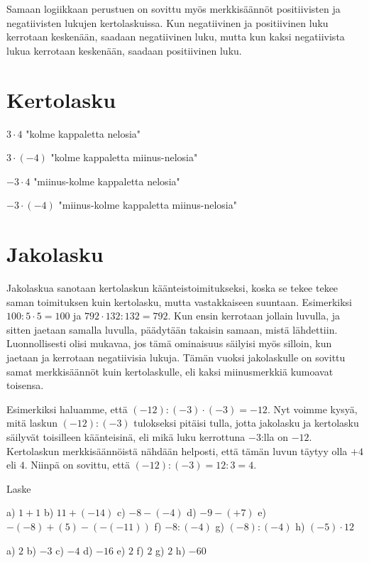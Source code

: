 
Samaan logiikkaan perustuen on sovittu myös merkkisäännöt positiivisten ja negatiivisten lukujen kertolaskuissa. Kun negatiivinen ja positiivinen luku kerrotaan keskenään, saadaan negatiivinen luku, mutta kun kaksi negatiivista lukua kerrotaan keskenään, saadaan positiivinen luku.

\section{Kertolasku}

$3 \cdot 4$ "kolme kappaletta nelosia"


$3 \cdot (-4)$ "kolme kappaletta miinus-nelosia"


$-3 \cdot 4$ "miinus-kolme kappaletta nelosia"


$-3 \cdot (-4)$ "miinus-kolme kappaletta miinus-nelosia"


\section{Jakolasku}

Jakolaskua sanotaan kertolaskun käänteistoimitukseksi, koska se tekee tekee saman toimituksen kuin kertolasku, mutta vastakkaiseen suuntaan. Esimerkiksi $100:5\cdot 5=100$ ja $792\cdot 132:132=792$. Kun ensin kerrotaan jollain luvulla, ja sitten jaetaan samalla luvulla, päädytään takaisin samaan, mistä lähdettiin. Luonnollisesti olisi mukavaa, jos tämä ominaisuus säilyisi myös silloin, kun jaetaan ja kerrotaan negatiivisia lukuja. Tämän vuoksi jakolaskulle on sovittu samat merkkisäännöt kuin kertolaskulle, eli kaksi miinusmerkkiä kumoavat toisensa.

Esimerkiksi haluamme, että $(-12):(-3)\cdot (-3)=-12$. Nyt voimme kysyä, mitä laskun $(-12):(-3)$ tulokseksi pitäisi tulla, jotta jakolasku ja kertolasku säilyvät toisilleen käänteisinä, eli mikä luku kerrottuna $-3$:lla on $-12$. Kertolaskun merkkisäännöistä nähdään helposti, että tämän luvun täytyy olla $+4$ eli $4$. Niinpä on sovittu, että $(-12):(-3)=12:3=4$.

Laske

\begin{tehtava}
    a) $1+1$
    b) $11+(-14)$
    c) $-8-(-4)$
    d) $-9-(+7)$
    e) $-(-8)+(5)-(-(-11))$
    f) $-8:(-4)$
    g) $(-8):(-4)$
    h) $(-5)\cdot 12$

    \begin{vastaus}
        a) $2$
        b) $-3$
        c) $-4$
        d) $-16$
        e) $2$
        f) $2$
        g) $2$
        h) $-60$
    \end{vastaus}
\end{tehtava}

